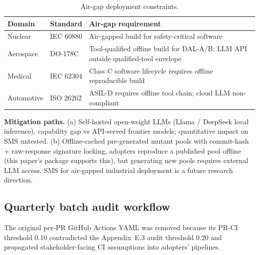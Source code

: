 \documentclass[review,12pt,authoryear]{elsarticle}
\begin{document}
{\def\LTcaptype{table} %
\begin{longtable}[]{@{}
  >{\raggedright\arraybackslash}p{}
  >{\raggedright\arraybackslash}p{}
  >{\raggedright\arraybackslash}p{}@{}}
\caption{Air-gap deployment constraints.}\label{tab:p2-25}\\
\toprule\noalign{}
\begin{minipage}[b]{\linewidth}\raggedright
Domain
\end{minipage} & \begin{minipage}[b]{\linewidth}\raggedright
Standard
\end{minipage} & \begin{minipage}[b]{\linewidth}\raggedright
Air-gap requirement
\end{minipage} \\
\midrule\noalign{}
\endfirsthead
\endhead
\bottomrule\noalign{}
\endlastfoot
Nuclear & IEC 60880 & Air-gapped build for safety-critical software \\
Aerospace & DO-178C & Tool-qualified offline build for DAL-A/B; LLM API
outside qualified-tool envelope \\
Medical & IEC 62304 & Class C software lifecycle requires offline
reproducible build \\
Automotive & ISO 26262 & ASIL-D requires offline tool chain; cloud LLM
non-compliant \\
\end{longtable}
}

\textbf{Mitigation paths.} (a) Self-hosted open-weight LLMs (Llama
/ DeepSeek local inference), capability gap vs API-served frontier
models; quantitative impact on SMS untested. (b) Offline-cached
pre-generated mutant pools with commit-hash + raw-response signature
locking, adopters reproduce a published pool offline (this paper's
package supports this), but generating new pools requires external LLM
access. SMS for air-gapped industrial deployment is a future research
direction.

\subsection{Quarterly batch audit workflow}\label{e.2-quarterly-batch-audit-workflow}

The original per-PR GitHub Actions YAML was removed because its PR-CI
threshold 0.10 contradicted the Appendix~E.3 audit threshold 0.20 and propagated
stakeholder-facing CI assumptions into adopters' pipelines.
\end{document}
